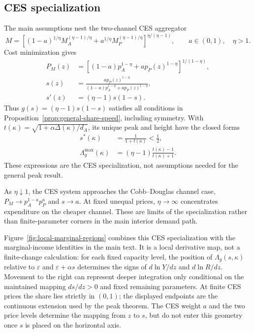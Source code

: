 \subsection{CES specialization}
\label{app:ces}

The main assumptions nest the two-channel CES aggregator
\begin{equation}
 M=\left[(1-a)^{1/\eta}M_A^{(\eta-1)/\eta}
 +a^{1/\eta}M_P^{(\eta-1)/\eta}\right]^{\eta/(\eta-1)},
 \qquad a\in(0,1),\quad\eta>1.
 \label{eq:ces-specialization}
\end{equation}
Cost minimization gives
\begin{align}
 P_M(z)&=\left[(1-a)p_A^{1-\eta}
 +ap_P(z)^{1-\eta}\right]^{1/(1-\eta)}, \\
 s(z)&=\frac{ap_P(z)^{1-\eta}}
 {(1-a)p_A^{1-\eta}+ap_P(z)^{1-\eta}}, \\
 s'(z)&=(\eta-1)s(1-s).
 \label{eq:ces-price-share}
\end{align}
Thus \(g(s)=(\eta-1)s(1-s)\) satisfies all conditions in
Proposition~\ref{prop:general-share-speed}, including symmetry. With
\(t(\kappa)=\sqrt{1+\alpha\Delta(\kappa)/d_A}\), its unique peak and height
have the closed forms
\begin{align}
 s^*(\kappa)&=\frac{1}{1+t(\kappa)}<\frac12, \\
 \Lambda_g^{\max}(\kappa)
 &=(\eta-1)\frac{t(\kappa)-1}{t(\kappa)+1}.
 \label{eq:ces-peak-closed-form}
\end{align}
These expressions are the CES specialization, not assumptions needed for the
general peak result.

As \(\eta\downarrow1\), the CES system approaches the Cobb--Douglas channel
case, \(P_M\to p_A^{1-a}p_P^a\) and \(s\to a\). At fixed unequal prices,
\(\eta\to\infty\) concentrates expenditure on the cheaper channel. These are
limits of the specialization rather than finite-parameter corners in the main
interior demand path.

Figure~\ref{fig:local-marginal-regions} combines this CES specialization with
the marginal-income identities in the main text. It is a local derivative
map, not a finite-change calculation: for each fixed capacity level, the
position of \(\Lambda_g(s,\kappa)\) relative to \(\varepsilon\) and
\(\varepsilon+\alpha s\) determines the signs of \(d\ln Y/dz\) and
\(d\ln R/dz\). Movement to the right can represent deeper integration only
conditional on the maintained mapping \(ds/dz>0\) and fixed remaining
parameters. At finite CES prices the share lies strictly in \((0,1)\); the
displayed endpoints are the continuous extension used by the peak theorem.
The CES weight \(a\) and the two price levels determine the mapping from \(z\)
to \(s\), but do not enter this geometry once \(s\) is placed on the horizontal
axis.

